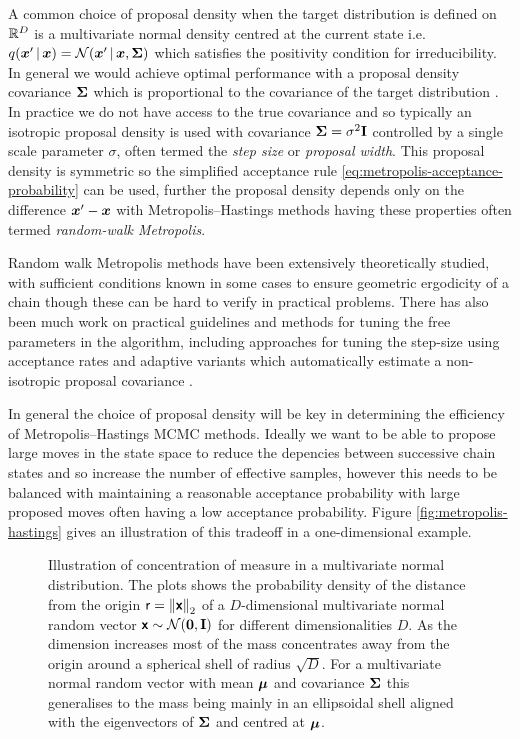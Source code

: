 A common choice of proposal density when the target distribution is defined on $\mathbb{R}^D$ is a multivariate normal density centred at the current state i.e. $q(\vct{x}'\gvn\vct{x}) = \nrm{\vct{x}' \gvn \vct{x}, \mtx{\Sigma}}$ which satisfies the positivity condition for irreducibility. In general we would achieve optimal performance with a proposal density covariance $\boldsymbol{\Sigma}$ which is proportional to the covariance of the target distribution \citep{rosenthal2011optimal}. In practice we do not have access to the true covariance and so typically an isotropic proposal density is used with covariance $\boldsymbol{\Sigma} = \sigma^2\mathbf{I}$ controlled by a single scale parameter $\sigma$, often termed the \emph{step size} or \emph{proposal width}. This proposal density is symmetric so the simplified acceptance rule \eqref{eq:metropolis-acceptance-probability} can be used, further the proposal density depends only on the difference $\boldsymbol{x}' - \boldsymbol{x}$ with Metropolis--Hastings methods having these properties often termed \emph{random-walk Metropolis}. 

Random walk Metropolis methods have been extensively theoretically studied, with sufficient conditions known in some cases to ensure geometric ergodicity of a chain \citep{mengersen1996rates,roberts1996geometric} though these can be hard to verify in practical problems. There has also been much work on practical guidelines and methods for tuning the free parameters in the algorithm, including approaches for tuning the step-size using acceptance rates \citep{gelman1997weak,roberts2001optimal} and adaptive variants which automatically estimate a non-isotropic proposal covariance \citep{haario2001adaptive,rosenthal2011optimal}.

In general the choice of proposal density will be key in determining the efficiency of Metropolis--Hastings \ac{MCMC} methods. Ideally we want to be able to propose large moves in the state space to reduce the depencies between successive chain states and so increase the number of effective samples, however this needs to be balanced with maintaining a reasonable acceptance probability with large proposed moves often having a low acceptance probability. Figure \ref{fig:metropolis-hastings} gives an illustration of this tradeoff in a one-dimensional example. 

\begin{figure}[!t]
\centering
{}
\caption[Concentration of measure in high dimensions.]{Illustration of concentration of measure in a multivariate normal distribution. The plots shows the probability density of the distance from the origin $\rvar{r} = \left\Vert\rvct{x}\right\Vert_2$ of a $D$-dimensional multivariate normal random vector $\rvct{x} \sim \nrm{\vct{0},\mathbf{I}}$ for different dimensionalities $D$. As the dimension increases most of the mass concentrates away from the origin around a spherical shell of radius $\sqrt{D}$. For a multivariate normal random vector with mean $\boldsymbol{\mu}$ and covariance $\boldsymbol{\Sigma}$ this generalises to the mass being mainly in an ellipsoidal shell aligned with the eigenvectors of $\boldsymbol{\Sigma}$ and centred at $\boldsymbol{\mu}$.}
\label{fig:concentration-of-measure-gaussian}
\end{figure}

